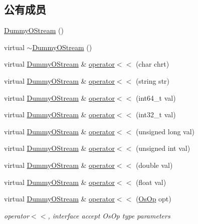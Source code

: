 \subsection*{公有成员}
\begin{DoxyCompactItemize}
\item 
\hyperlink{classHSF_1_1DummyOStream_a295657be440a5d921ca7e547526e7188}{DummyOStream} ()
\item 
virtual \hyperlink{classHSF_1_1DummyOStream_a525d3b3ad0b0fcf15c630774f9c022ab}{$\sim$DummyOStream} ()
\item 
virtual \hyperlink{classHSF_1_1DummyOStream}{DummyOStream} \& \hyperlink{classHSF_1_1DummyOStream_a2388508ce3a9278f7d0aa4ccfd56f432}{operator$<$$<$} (char chrt)
\item 
virtual \hyperlink{classHSF_1_1DummyOStream}{DummyOStream} \& \hyperlink{classHSF_1_1DummyOStream_ab67a98f5212d00528d5dda50e9858b7b}{operator$<$$<$} (string str)
\item 
virtual \hyperlink{classHSF_1_1DummyOStream}{DummyOStream} \& \hyperlink{classHSF_1_1DummyOStream_a439a7fa1b22a1e7bcc49fa43c686dc0d}{operator$<$$<$} (int64\_\-t val)
\item 
virtual \hyperlink{classHSF_1_1DummyOStream}{DummyOStream} \& \hyperlink{classHSF_1_1DummyOStream_a58e20bb47f254b73898d940bb496ee1f}{operator$<$$<$} (int32\_\-t val)
\item 
virtual \hyperlink{classHSF_1_1DummyOStream}{DummyOStream} \& \hyperlink{classHSF_1_1DummyOStream_a7c3f9f5c2e3a05760819499df1aa6592}{operator$<$$<$} (unsigned long val)
\item 
virtual \hyperlink{classHSF_1_1DummyOStream}{DummyOStream} \& \hyperlink{classHSF_1_1DummyOStream_a9a138ca0d1ea4ebc7b3d699391bb3635}{operator$<$$<$} (unsigned int val)
\item 
virtual \hyperlink{classHSF_1_1DummyOStream}{DummyOStream} \& \hyperlink{classHSF_1_1DummyOStream_a727be32ccd88ccaee0fae2e8d148e9b5}{operator$<$$<$} (double val)
\item 
virtual \hyperlink{classHSF_1_1DummyOStream}{DummyOStream} \& \hyperlink{classHSF_1_1DummyOStream_af27eca0aa6a04ff2a0e86bc668d88dcd}{operator$<$$<$} (float val)
\item 
virtual \hyperlink{classHSF_1_1DummyOStream}{DummyOStream} \& \hyperlink{classHSF_1_1DummyOStream_a7b609938f7a2d4304a463d6164c2ec3b}{operator$<$$<$} (\hyperlink{namespaceHSF_a5c97750573f23c09a9fed0efa5baa52d}{OsOp} opt)
\begin{DoxyCompactList}\small\item\em operator$<$$<$, interface accept OsOp type parameters \item\end{DoxyCompactList}\item 

\end{DoxyCompactItemize}
